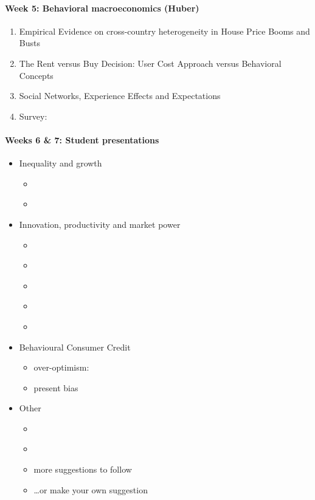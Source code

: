 \documentclass[a4paper,12pt]{article}
\begin{document}
\paragraph{Week 5: Behavioral macroeconomics (Huber)}
\begin{enumerate}
\item Empirical Evidence on cross-country heterogeneity in House Price Booms and Busts \citep{Huber:2019}
\item The Rent versus Buy Decision: User Cost Approach
  versus Behavioral Concepts
  \citep{Huber:2022,Huber:2020}
\item Social Networks, Experience Effects and Expectations 
  \citep{Kuchler:2019, bailey2018housing, Malmendier:2019, kaplan2020housing}
\item Survey: \citep{kuchler2022expectations}
\end{enumerate}

\paragraph{Weeks 6 \& 7: Student presentations}

\begin{itemize}
\item Inequality and growth
  \begin{itemize}
  \item \citet{moll2022uneven}
  \item \citet{lippi2021unequal}
  \end{itemize}
\item Innovation, productivity and market power
  \begin{itemize}
  \item \citet{deloecker2020market-power}
  \item \citet{liu2022interest-power}
  \item \citet{akcigit2019business-dynamism}
  \item \citet{aghion2018innovation-inequality}
  \item \citet{acemoglu2018innovation-growth}
  \end{itemize}
\item Behavioural Consumer Credit
  \begin{itemize}
  \item over-optimism: \citep{exler2020over-optimistic}
  \item present bias \citep{laibson2021present}
  \end{itemize}
\item Other
  \begin{itemize}
  \item \citet{bailey2019beliefs-leverage}
  \item \citet{laibson2022mpc-to-mpx}
  \item more suggestions to follow
  \item \dots or make your own suggestion
  \end{itemize}
\end{itemize}
\end{document}
